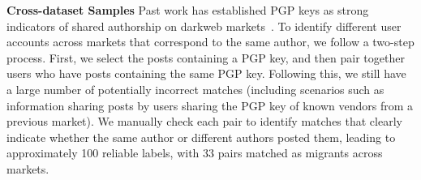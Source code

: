 \noindent \textbf{Cross-dataset Samples} 
Past work has established PGP keys as strong indicators of shared authorship on darkweb markets~\cite{tai2019adversarial}. 
To identify different user accounts across markets that correspond to the same author, we follow a two-step process. 
First, we select the posts containing a PGP key, and then pair together users who have posts containing the same PGP key. 
Following this, we still have a large number of potentially incorrect matches (including scenarios such as information sharing posts by users sharing the PGP key of known vendors from a previous market). 
We manually check each pair to identify matches that clearly indicate whether the same author or different authors posted them, leading to approximately 100 reliable labels, with 33 pairs matched as migrants across markets.
